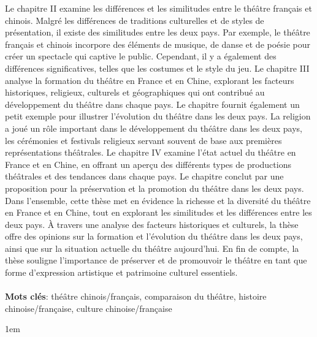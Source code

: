 \documentclass[UTF8,a4paper,12pt]{ctexart}
\numberwithin{equation}{section}
\begin{document}
Le chapitre II examine les différences et les similitudes entre le théâtre français et chinois. Malgré les différences de traditions culturelles et de styles de présentation, il existe des similitudes entre les deux pays. Par exemple, le théâtre français et chinois incorpore des éléments de musique, de danse et de poésie pour créer un spectacle qui captive le public. Cependant, il y a également des différences significatives, telles que les costumes et le style du jeu.
Le chapitre III analyse la formation du théâtre en France et en Chine, explorant les facteurs historiques, religieux, culturels et géographiques qui ont contribué au développement du théâtre dans chaque pays. Le chapitre fournit également un petit exemple pour illustrer l'évolution du théâtre dans les deux pays. La religion a joué un rôle important dans le développement du théâtre dans les deux pays, les cérémonies et festivals religieux servant souvent de base aux premières représentations théâtrales.
Le chapitre IV examine l'état actuel du théâtre en France et en Chine, en offrant un aperçu des différents types de productions théâtrales et des tendances dans chaque pays. Le chapitre conclut par une proposition pour la préservation et la promotion du théâtre dans les deux pays.
Dans l'ensemble, cette thèse met en évidence la richesse et la diversité du théâtre en France et en Chine, tout en explorant les similitudes et les différences entre les deux pays. À travers une analyse des facteurs historiques et culturels, la thèse offre des opinions sur la formation et l'évolution du théâtre dans les deux pays, ainsi que sur la situation actuelle du théâtre aujourd'hui. En fin de compte, la thèse souligne l'importance de préserver et de promouvoir le théâtre en tant que forme d'expression artistique et patrimoine culturel essentiels.\\
~\\
\textbf{Mots clés}: théâtre chinois/français, comparaison du théâtre, histoire chinoise/française, culture chinoise/française 

\newpage
\renewcommand\contentsname{\MakeUppercase{\textbf{Table des Matieres}}}


\begin{center}
{\tableofcontents
\thispagestyle{fancy}
}
\end{center}

\emergencystretch 1em
\newpage
{}
\end{document}
